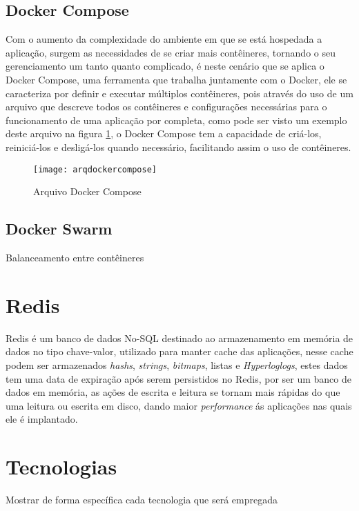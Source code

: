 \subsection{Docker Compose}
Com o aumento da complexidade do ambiente em que se está hospedada a aplicação, surgem as necessidades de se criar mais contêineres, tornando o seu gerenciamento um tanto quanto complicado, é neste cenário que se aplica o Docker Compose, uma ferramenta que trabalha juntamente com o Docker, ele se caracteriza por definir e executar múltiplos contêineres, pois através do uso de um arquivo que descreve todos os contêineres e configurações necessárias para o funcionamento de uma aplicação por completa, como pode ser visto um exemplo deste arquivo na figura \ref{fig:arqdockercompose}, o Docker Compose tem a capacidade de criá-los, reiniciá-los e desligá-los quando necessário, facilitando assim o uso de contêineres.

\begin{figure}[!h]
\caption{\label{fig:arqdockercompose} Arquivo Docker Compose}
\begin{center}
\texttt{[image: arqdockercompose]}
\end{center}
\end{figure}

\subsection{Docker Swarm}
Balanceamento entre contêineres

\section{Redis}
\label{sec:redis}
Redis é um banco de dados No-SQL destinado ao armazenamento em memória de dados no tipo chave-valor, utilizado para manter cache das aplicações, nesse cache podem ser armazenados \textit{hashs}, \textit{strings}, \textit{bitmaps}, listas e \textit{Hyperloglogs}, estes dados tem uma data de expiração após serem persistidos no Redis, por ser um banco de dados em memória, as ações de escrita e leitura se tornam mais rápidas do que uma leitura ou escrita em disco, dando maior \textit{performance} ás aplicações nas quais ele é implantado.~\cite{da2015redis}

\section{Tecnologias}
\label{sec:tecnologias}
Mostrar de forma específica cada tecnologia que será empregada

